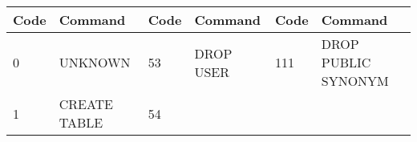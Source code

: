 \begin{longtable}[]{@{}llllll@{}}
\toprule
\begin{minipage}[b]{0.06\columnwidth}\raggedright\strut
Code\strut
\end{minipage} & \begin{minipage}[b]{0.19\columnwidth}\raggedright\strut
Command\strut
\end{minipage} & \begin{minipage}[b]{0.06\columnwidth}\raggedright\strut
Code\strut
\end{minipage} & \begin{minipage}[b]{0.24\columnwidth}\raggedright\strut
Command\strut
\end{minipage} & \begin{minipage}[b]{0.06\columnwidth}\raggedright\strut
Code\strut
\end{minipage} & \begin{minipage}[b]{0.24\columnwidth}\raggedright\strut
Command\strut
\end{minipage}\tabularnewline
\midrule
\endhead
\begin{minipage}[t]{0.06\columnwidth}\raggedright\strut
0\strut
\end{minipage} & \begin{minipage}[t]{0.19\columnwidth}\raggedright\strut
UNKNOWN\strut
\end{minipage} & \begin{minipage}[t]{0.06\columnwidth}\raggedright\strut
53\strut
\end{minipage} & \begin{minipage}[t]{0.24\columnwidth}\raggedright\strut
DROP USER\strut
\end{minipage} & \begin{minipage}[t]{0.06\columnwidth}\raggedright\strut
111\strut
\end{minipage} & \begin{minipage}[t]{0.24\columnwidth}\raggedright\strut
DROP PUBLIC SYNONYM\strut
\end{minipage}\tabularnewline
\begin{minipage}[t]{0.06\columnwidth}\raggedright\strut
1\strut
\end{minipage} & \begin{minipage}[t]{0.19\columnwidth}\raggedright\strut
CREATE TABLE\strut
\end{minipage} & \begin{minipage}[t]{0.06\columnwidth}\raggedright\strut
54\strut
\end{minipage} & \begin{minipage}[t]{0.24\columnwidth}\raggedright\strut

\end{minipage}
\end{longtable}
